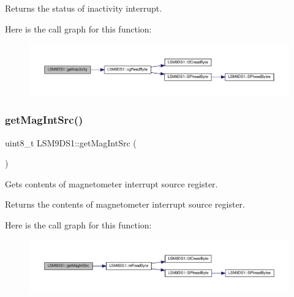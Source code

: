 \begin{DoxyReturn}{Returns}
the status of inactivity interrupt. 
\end{DoxyReturn}
Here is the call graph for this function\+:\nopagebreak
\begin{figure}[H]
\begin{center}
\leavevmode
\includegraphics[width=350pt]{classLSM9DS1_a9dab029d1d24e49709258d893042d28f_cgraph}
\end{center}
\end{figure}
\mbox{\label{classLSM9DS1_a2bc92a37db982059b89e0a06e7d05a95}} 
\subsubsection{\texorpdfstring{get\+Mag\+Int\+Src()}{getMagIntSrc()}}
{\footnotesize\ttfamily uint8\+\_\+t L\+S\+M9\+D\+S1\+::get\+Mag\+Int\+Src (\begin{DoxyParamCaption}{ }\end{DoxyParamCaption})}



Gets contents of magnetometer interrupt source register. 

\begin{DoxyReturn}{Returns}
the contents of magnetometer interrupt source register. 
\end{DoxyReturn}
Here is the call graph for this function\+:\nopagebreak
\begin{figure}[H]
\begin{center}
\leavevmode
\includegraphics[width=350pt]{classLSM9DS1_a2bc92a37db982059b89e0a06e7d05a95_cgraph}
\end{center}
\end{figure}
\mbox{\label{classLSM9DS1_a65b71a03a30f4e8ed1ffd46de3db0560}} 

